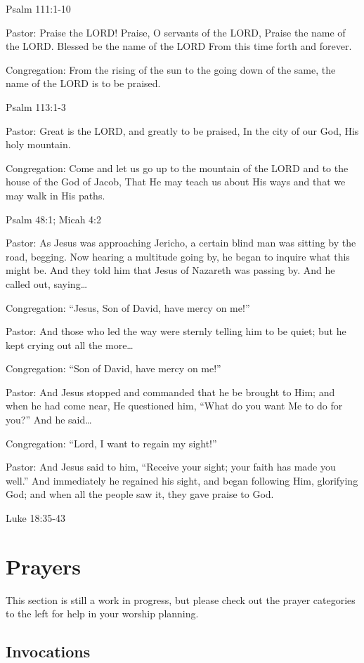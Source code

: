 \documentclass[]{book}
\begin{document}
Psalm 111:1-10 \textbar{}

Pastor: Praise the LORD! Praise, O servants of the LORD, Praise the name
of the LORD. Blessed be the name of the LORD From this time forth and
forever.

Congregation: From the rising of the sun to the going down of the same,
the name of the LORD is to be praised.

Psalm 113:1-3 \textbar{}

Pastor: Great is the LORD, and greatly to be praised, In the city of our
God, His holy mountain.

Congregation: Come and let us go up to the mountain of the LORD and to
the house of the God of Jacob, That He may teach us about His ways and
that we may walk in His paths.

Psalm 48:1; Micah 4:2 \textbar{}

Pastor: As Jesus was approaching Jericho, a certain blind man was
sitting by the road, begging. Now hearing a multitude going by, he began
to inquire what this might be. And they told him that Jesus of Nazareth
was passing by. And he called out, saying\ldots{}

Congregation: ``Jesus, Son of David, have mercy on me!''

Pastor: And those who led the way were sternly telling him to be quiet;
but he kept crying out all the more\ldots{}

Congregation: ``Son of David, have mercy on me!''

Pastor: And Jesus stopped and commanded that he be brought to Him; and
when he had come near, He questioned him, ``What do you want Me to do
for you?'' And he said\ldots{}

Congregation: ``Lord, I want to regain my sight!''

Pastor: And Jesus said to him, ``Receive your sight; your faith has made
you well.'' And immediately he regained his sight, and began following
Him, glorifying God; and when all the people saw it, they gave praise to
God.

Luke 18:35-43 \textbar{}

\chapter{Prayers}\label{prayers}

This section is still a work in progress, but please check out the
prayer categories to the left for help in your worship planning.

\section{Invocations}\label{invocations}
\end{document}
